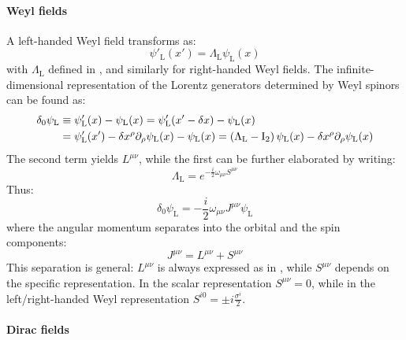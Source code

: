 \paragraph{Weyl fields}

A left-handed Weyl field transforms as:
\begin{equation}
  \psi'_\text{L}(x') = \Lambda_\text{L} \psi_\text{L}(x)
\end{equation}
with $ \Lambda_\text{L} $ defined in , and similarly for right-handed Weyl fields. The infinite-dimensional representation of the Lorentz generators determined by Weyl spinors can be found as:
\begin{equation*}
  \begin{split}
    \delta_0 \psi_\text{L} &\equiv \psi'_\text{L}(x) - \psi_\text{L}(x) = \psi'_\text{L}(x' - \delta x) - \psi_\text{L}(x) \\
                           &= \psi'_\text{L}(x') - \delta x^\rho \partial_\rho \psi_\text{L}(x) - \psi_\text{L}(x) = \left( \Lambda_\text{L} - \mathrm{I}_2 \right) \psi_\text{L}(x) - \delta x^\rho \partial_\rho \psi_\text{L}(x)
  \end{split}
\end{equation*}
The second term yields $ L^{\mu \nu} $, while the first can be further elaborated by writing:
\begin{equation}
  \Lambda_\text{L} = e^{-\frac{i}{2} \omega_{\mu \nu} S^{\mu \nu}}
\end{equation}
Thus:
\begin{equation*}
  \delta_0 \psi_\text{L} = - \frac{i}{2} \omega_{\mu \nu} J^{\mu \nu} \psi_\text{L}
\end{equation*}
where the angular momentum separates into the orbital and the spin components:
\begin{equation}
  J^{\mu \nu} = L^{\mu \nu} + S^{\mu \nu}
\end{equation}
This separation is general: $ L^{\mu \nu} $ is always expressed as in , while $ S^{\mu \nu} $ depends on the specific representation. In the scalar representation $ S^{\mu \nu} = 0 $, while in the left/right-handed Weyl representation $ S^{i0} = \pm i \frac{\sigma^i}{2} $.

\paragraph{Dirac fields}

